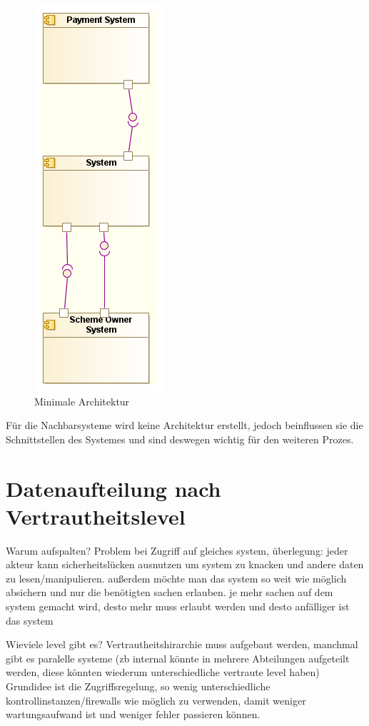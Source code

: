 \begin{figure}[!htbp]
    \centering
    \includegraphics[scale=0.5]{uml/minimalarch.png}
    \caption{Minimale Architektur}
\end{figure}

Für die Nachbarsysteme wird keine Architektur erstellt, jedoch beinflussen sie die Schnittstellen des Systemes und sind deswegen wichtig für den weiteren Prozes.

\section{Datenaufteilung nach Vertrautheitslevel}
Warum aufspalten? Problem bei Zugriff auf gleiches system, überlegung: jeder akteur kann sicherheitslücken ausnutzen um system zu knacken und andere daten zu lesen/manipulieren. außerdem möchte man das system so weit wie möglich absichern und nur die benötigten sachen erlauben. je mehr sachen auf dem system gemacht wird, desto mehr muss erlaubt werden und desto anfälliger ist das system

Wieviele level gibt es? Vertrautheitshirarchie muss aufgebaut werden, manchmal gibt es paralelle systeme (zb internal könnte in mehrere Abteilungen aufgeteilt werden, diese könnten wiederum unterschiedliche vertraute level haben) Grundidee ist die Zugriffsregelung, so wenig unterschiedliche kontrollinstanzen/firewalls wie möglich zu verwenden, damit weniger wartungsaufwand ist und weniger fehler passieren können.

